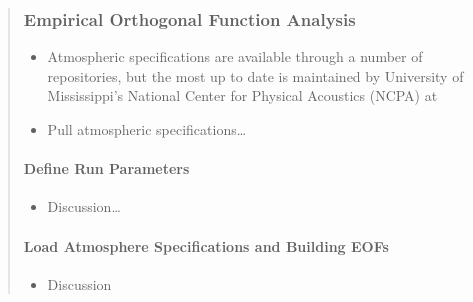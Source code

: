 \documentclass[letterpaper,10pt,english]{sphinxmanual}
\begin{document}
\label{\detokenize{analysis:section-links}}\begin{quote}


\subsubsection{Empirical Orthogonal Function Analysis}
\label{\detokenize{eofs:empirical-orthogonal-function-analysis}}\label{\detokenize{eofs:eofs}}\label{\detokenize{eofs::doc}}\begin{itemize}
\item {} 
Atmospheric specifications are available through a number of repositories, but the most up to date is maintained by University of Mississippi’s National Center for Physical Acoustics (NCPA) at 

\item {} 
Pull atmospheric specifications…

\end{itemize}


\paragraph{Define Run Parameters}
\label{\detokenize{eofs:define-run-parameters}}\begin{itemize}
\item {} 
Discussion…

\end{itemize}

\begin{sphinxVerbatim}[commandchars=\\\{\}]
  
  
  \PYG{p}{[} \PYG{p}{]}
  
  
\end{sphinxVerbatim}


\paragraph{Load Atmosphere Specifications and Building EOFs}
\label{\detokenize{eofs:load-atmosphere-specifications-and-building-eofs}}\begin{itemize}
\item {} 
Discussion


\end{itemize}
\end{quote}
\end{document}
